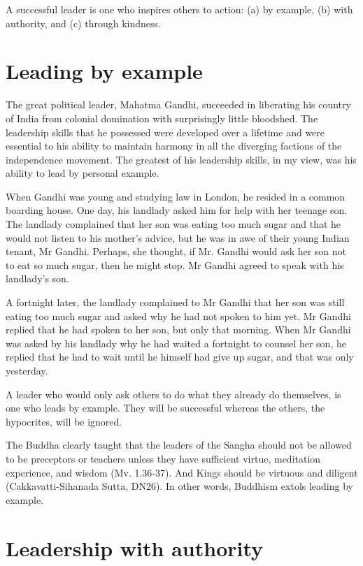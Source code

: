 \documentclass[11pt, openany]{book}
\begin{document}
A successful leader is one who inspires others to action: (a) by example, (b) with authority, and (c) through kindness.

\section{Leading by example}

The great political leader, Mahatma Gandhi, succeeded in liberating his country of India from colonial domination with surprisingly little bloodshed. The leadership skills that he possessed were developed over a lifetime and were essential to his ability to maintain harmony in all the diverging factions of the independence movement. The greatest of his leadership skills, in my view, was his ability to lead by personal example.

When Gandhi was young and studying law in London, he resided in a common boarding house. One day, his landlady asked him for help with her teenage son. The landlady complained that her son was eating too much sugar and that he would not listen to his mother’s advice, but he was in awe of their young Indian tenant, Mr Gandhi. Perhaps, she thought, if Mr. Gandhi would ask her son not to eat so much sugar, then he might stop. Mr Gandhi agreed to speak with his landlady’s son.

A fortnight later, the landlady complained to Mr Gandhi that her son was still eating too much sugar and asked why he had not spoken to him yet. Mr Gandhi replied that he had spoken to her son, but only that morning. When Mr Gandhi was asked by his landlady why he had waited a fortnight to counsel her son, he replied that he had to wait until he himself had give up sugar, and that was only yesterday.

A leader who would only ask others to do what they already do themselves, is one who leads by example. They will be successful whereas the others, the hypocrites, will be ignored.

The Buddha clearly taught that the leaders of the Sangha should not be allowed to be preceptors or teachers unless they have sufficient virtue, meditation experience, and wisdom (Mv. 1.36-37). And Kings should be virtuous and diligent (Cakkavatti-Sihanada Sutta, DN26). In other words, Buddhism extols leading by example.


\section{Leadership with authority}
\end{document}
